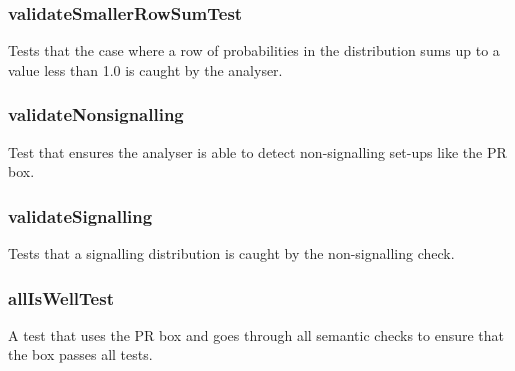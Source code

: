 \documentclass[report.tex]{subfiles}
\begin{document}
\subsubsection{validateSmallerRowSumTest} %
\label{ssub:validatesmallerrowsumtest}
Tests that the case where a row of probabilities in the distribution sums up to
a value less than 1.0 is caught by the analyser.

\subsubsection{validateNonsignalling} %
\label{ssub:validatenonsignalling}
Test that ensures the analyser is able to detect non-signalling set-ups like the
PR box.

\subsubsection{validateSignalling} %
\label{ssub:validatesignalling}
Tests that a signalling distribution is caught by the non-signalling check.

\subsubsection{allIsWellTest} %
\label{ssub:alliswelltest}
A test that uses the PR box and goes through all semantic checks to ensure that
the box passes all tests.
\end{document}
